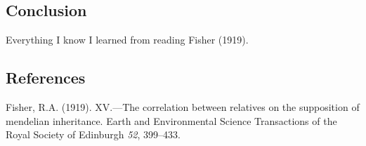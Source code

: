 \documentclass[12pt,a4paper,]{article}
\begin{document}
\subsection{Conclusion}\label{conclusion}

Everything I know I learned from reading Fisher (1919).

\subsection*{References}\label{references}

\hypertarget{refs}{}
\hypertarget{ref-fisher1919xv}{}
Fisher, R.A. (1919). XV.---The correlation between relatives on the
supposition of mendelian inheritance. Earth and Environmental Science
Transactions of the Royal Society of Edinburgh \emph{52}, 399--433.
\end{document}
